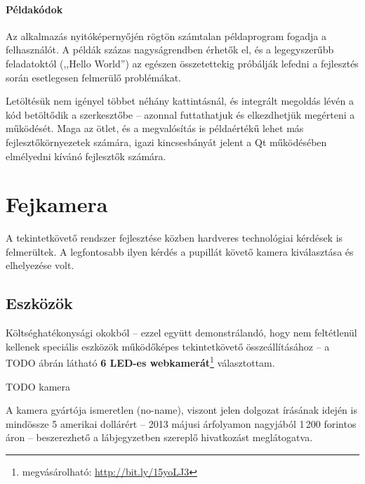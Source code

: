 \paragraph{Példakódok}

Az alkalmazás nyitóképernyőjén rögtön számtalan példaprogram fogadja a felhasználót. A példák százas nagyságrendben érhetők el, és a legegyszerűbb feladatoktól (,,Hello World'') az egészen összetettekig próbálják lefedni a fejlesztés során esetlegesen felmerülő problémákat.

Letöltésük nem igényel többet néhány kattintásnál, és integrált megoldás lévén a kód betöltődik a szerkesztőbe -- azonnal futtathatjuk és elkezdhetjük megérteni a működését. Maga az ötlet, és a megvalósítás is példaértékű lehet más fejlesztőkörnyezetek számára, igazi kincsesbányát jelent a Qt működésében elmélyedni kívánó fejlesztők számára.

\section{Fejkamera}\label{sect:infracam}

A tekintetkövető rendszer fejlesztése közben hardveres technológiai kérdések is felmerültek. A legfontosabb ilyen kérdés a pupillát követő kamera kiválasztása és elhelyezése volt.

\subsection{Eszközök}\label{sect:infracam_eszkozok}

Költséghatékonysági okokból -- ezzel együtt demonstrálandó, hogy nem feltétlenül kellenek speciális eszközök működőképes tekintetkövető összeállításához -- a TODO ábrán látható \textbf{6 LED-es webkamerát}\footnote{megvásárolható: \url{http://bit.ly/15yoLJ3}} választottam.

TODO kamera

A kamera gyártója ismeretlen (no-name), viszont jelen dolgozat írásának idején is mindössze 5 amerikai dollárért  -- 2013 májusi árfolyamon nagyjából 1\,200 forintos áron -- beszerezhető a lábjegyzetben szereplő hivatkozást meglátogatva.

